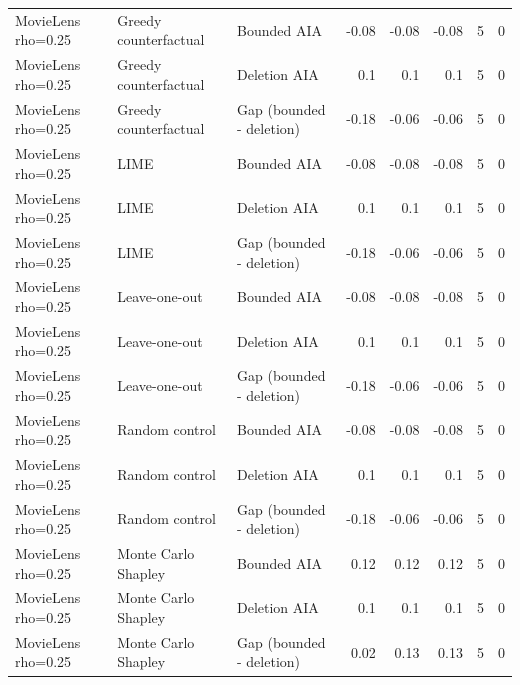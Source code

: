 \begin{table}[t]
{\begin{tabular}{lllrrrrr}
MovieLens rho=0.25 & Greedy counterfactual & Bounded AIA & -0.08 & -0.08 & -0.08 & 5 & 0 \\
MovieLens rho=0.25 & Greedy counterfactual & Deletion AIA & 0.1 & 0.1 & 0.1 & 5 & 0 \\
MovieLens rho=0.25 & Greedy counterfactual & Gap (bounded - deletion) & -0.18 & -0.06 & -0.06 & 5 & 0 \\
MovieLens rho=0.25 & LIME & Bounded AIA & -0.08 & -0.08 & -0.08 & 5 & 0 \\
MovieLens rho=0.25 & LIME & Deletion AIA & 0.1 & 0.1 & 0.1 & 5 & 0 \\
MovieLens rho=0.25 & LIME & Gap (bounded - deletion) & -0.18 & -0.06 & -0.06 & 5 & 0 \\
MovieLens rho=0.25 & Leave-one-out & Bounded AIA & -0.08 & -0.08 & -0.08 & 5 & 0 \\
MovieLens rho=0.25 & Leave-one-out & Deletion AIA & 0.1 & 0.1 & 0.1 & 5 & 0 \\
MovieLens rho=0.25 & Leave-one-out & Gap (bounded - deletion) & -0.18 & -0.06 & -0.06 & 5 & 0 \\
MovieLens rho=0.25 & Random control & Bounded AIA & -0.08 & -0.08 & -0.08 & 5 & 0 \\
MovieLens rho=0.25 & Random control & Deletion AIA & 0.1 & 0.1 & 0.1 & 5 & 0 \\
MovieLens rho=0.25 & Random control & Gap (bounded - deletion) & -0.18 & -0.06 & -0.06 & 5 & 0 \\
MovieLens rho=0.25 & Monte Carlo Shapley & Bounded AIA & 0.12 & 0.12 & 0.12 & 5 & 0 \\
MovieLens rho=0.25 & Monte Carlo Shapley & Deletion AIA & 0.1 & 0.1 & 0.1 & 5 & 0 \\
MovieLens rho=0.25 & Monte Carlo Shapley & Gap (bounded - deletion) & 0.02 & 0.13 & 0.13 & 5 & 0 \\
\bottomrule
\end{tabular}
}
\end{table}
